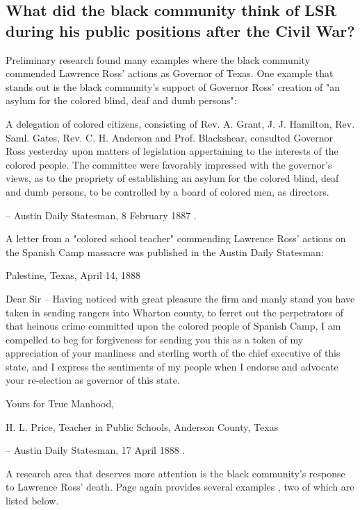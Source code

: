 \documentclass[12pt]{article}
\begin{document}
\subsection{What did the black community think of LSR during his public positions after the Civil War?}
Preliminary research found many examples where the black community commended Lawrence Ross' actions as Governor of Texas. One example that stands out is the black community's support of Governor Ross' creation of "an asylum for the colored blind, deaf and dumb persons":

\begin{displayquote}
A delegation of colored citizens, consisting of Rev. A. Grant, J. J. Hamilton, Rev. Saml. Gates, Rev. C. H. Anderson and Prof. Blackshear, consulted Governor Ross yesterday upon matters of legislation appertaining to the interests of the colored people. The committee were favorably impressed with the governor’s views, as to the propriety of establishing an asylum for the colored blind, deaf and dumb persons, to be controlled by a board of colored men, as directors.

-- Austin Daily Statesman, 8 February 1887 \cite{astatesman:1887-02-08}.
\end{displayquote}

A letter from a "colored school teacher" commending Lawrence Ross' actions on the Spanish Camp massacre was published in the Austin Daily Statesman: 
\begin{displayquote}
Palestine, Texas, April 14, 1888

Dear Sir – Having noticed with great pleasure the firm and manly stand you have taken in sending rangers into Wharton county, to ferret out the perpetrators of that heinous crime committed upon the colored people of Spanish Camp, I am compelled to beg for forgiveness for sending you this as a token of my appreciation of your manliness and sterling worth of the chief executive of this state, and I express the sentiments of my people when I endorse and advocate your re-election as governor of this state.

Yours for True Manhood,

H. L. Price,
Teacher in Public Schools, Anderson County, Texas

-- Austin Daily Statesman, 17 April 1888 \cite{astatesman:1888-04-17}.
\end{displayquote}

A research area that deserves more attention is the black community's response to Lawrence Ross' death. Page again provides several examples \cite{page}, two of which are listed below. 
\end{document}
